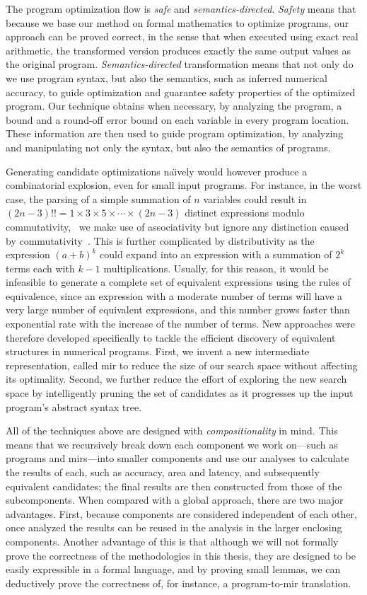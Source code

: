 The program optimization flow is \emph{safe} and \emph{semantics-directed}.
\emph{Safety} means that because we base our method on formal mathematics to
optimize programs, our approach can be proved correct, in the sense that when
executed using exact real arithmetic, the transformed version produces exactly
the same output values as the original program. \emph{Semantics-directed}
transformation means that not only do we use program syntax, but also the
semantics, such as inferred numerical accuracy, to guide optimization and
guarantee safety properties of the optimized program.  Our technique obtains
when necessary, by analyzing the program, a bound and a round-off error bound
on each variable in every program location.  These information are then used to
guide program optimization, by analyzing and manipulating not only the syntax,
but also the semantics of programs.

Generating candidate optimizations na{\"\i}vely would however produce a
combinatorial explosion, even for small input programs.  For instance, in the
worst case, the parsing of a simple summation of $n$ variables could result
in $(2n - 3)!! = 1 \times 3 \times 5 \times \cdots \times (2n - 3)$ distinct
expressions modulo commutativity, \ie~we make use of associativity but ignore
any distinction caused by commutativity~\cite{ioualalen, mouilleron}.  This is
further complicated by distributivity as the expression ${(a + b)}^k$ could
expand into an expression with a summation of $2^k$ terms each with $k - 1$
multiplications.  Usually, for this reason, it would be infeasible to generate
a complete set of equivalent expressions using the rules of equivalence, since
an expression with a moderate number of terms will have a very large number of
equivalent expressions, and this number grows faster than exponential rate with
the increase of the number of terms.  New approaches were therefore developed
specifically to tackle the efficient discovery of equivalent structures in
numerical programs.  First, we invent a new intermediate representation,
called \gls{mir} to reduce the size of our search space without affecting its
optimality.  Second, we further reduce the effort of exploring the new search
space by intelligently pruning the set of candidates as it progresses up the
input program's abstract syntax tree.

All of the techniques above are designed with \emph{compositionality} in mind.
This means that we recursively break down each component we work on---such
as programs and \glspl{mir}---into smaller components and use our analyses
to calculate the results of each, such as accuracy, area and latency, and
subsequently equivalent candidates; the final results are then constructed from
those of the subcomponents.  When compared with a global approach, there are
two major advantages.  First, because components are considered independent
of each other, once analyzed the results can be reused in the analysis in the
larger enclosing components.  Another advantage of this is that although we
will not formally prove the correctness of the methodologies in this thesis,
they are designed to be easily expressible in a formal language, and by proving
small lemmas, we can deductively prove the correctness of, for instance, a
program-to-\gls{mir} translation.

